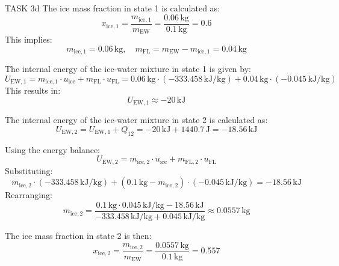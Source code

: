 TASK 3d  
The ice mass fraction in state 1 is calculated as:  
\[
x_{\text{ice},1} = \frac{m_{\text{ice},1}}{m_{\text{EW}}} = \frac{0.06 \, \text{kg}}{0.1 \, \text{kg}} = 0.6
\]  
This implies:  
\[
m_{\text{ice},1} = 0.06 \, \text{kg}, \quad m_{\text{FL}} = m_{\text{EW}} - m_{\text{ice},1} = 0.04 \, \text{kg}
\]  

The internal energy of the ice-water mixture in state 1 is given by:  
\[
U_{\text{EW},1} = m_{\text{ice},1} \cdot u_{\text{ice}} + m_{\text{FL}} \cdot u_{\text{FL}} = 0.06 \, \text{kg} \cdot (-333.458 \, \text{kJ/kg}) + 0.04 \, \text{kg} \cdot (-0.045 \, \text{kJ/kg})
\]  
This results in:  
\[
U_{\text{EW},1} \approx -20 \, \text{kJ}
\]  

The internal energy of the ice-water mixture in state 2 is calculated as:  
\[
U_{\text{EW},2} = U_{\text{EW},1} + Q_{12} = -20 \, \text{kJ} + 1440.7 \, \text{J} = -18.56 \, \text{kJ}
\]  

Using the energy balance:  
\[
U_{\text{EW},2} = m_{\text{ice},2} \cdot u_{\text{ice}} + m_{\text{FL},2} \cdot u_{\text{FL}}
\]  
Substituting:  
\[
m_{\text{ice},2} \cdot (-333.458 \, \text{kJ/kg}) + (0.1 \, \text{kg} - m_{\text{ice},2}) \cdot (-0.045 \, \text{kJ/kg}) = -18.56 \, \text{kJ}
\]  
Rearranging:  
\[
m_{\text{ice},2} = \frac{0.1 \, \text{kg} \cdot 0.045 \, \text{kJ/kg} - 18.56 \, \text{kJ}}{-333.458 \, \text{kJ/kg} + 0.045 \, \text{kJ/kg}} \approx 0.0557 \, \text{kg}
\]  

The ice mass fraction in state 2 is then:  
\[
x_{\text{ice},2} = \frac{m_{\text{ice},2}}{m_{\text{EW}}} = \frac{0.0557 \, \text{kg}}{0.1 \, \text{kg}} = 0.557
\]  